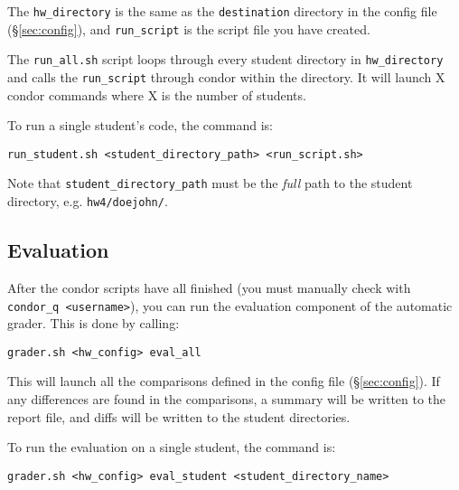 \documentclass[12pt]{article}
\begin{document}
\vspace{5pt}

\noindent The \texttt{hw\_directory}  is the same as the \texttt{destination} directory in the config file (\S\ref{sec:config}), and \texttt{run\_script} is the script file you have created.

The \texttt{run\_all.sh} script loops through every student directory in \texttt{hw\_directory} and calls the \texttt{run\_script} through condor within the directory. It will launch X condor commands where X is the number of students.

To run a single student's code, the command is:

\vspace{5pt}

\noindent \texttt{run\_student.sh <student\_directory\_path> <run\_script.sh>}

\vspace{5pt}

Note that \texttt{student\_directory\_path} must be the \textit{full} path to the student directory, e.g. \texttt{hw4/doejohn/}.

\subsection{Evaluation} \label{sec:secondgrade}

After the condor scripts have all finished (you must manually check with \texttt{condor\_q <username>}), you can run the evaluation component of the automatic grader. This is done by calling:

\vspace{5pt}

\noindent \texttt{grader.sh <hw\_config> eval\_all}

\vspace{5pt}

This will launch all the comparisons defined in the config file (\S\ref{sec:config}). If any differences are found in the comparisons, a summary will be written to the report file, and diffs will be written to the student directories.

To run the evaluation on a single student, the command is:

\vspace{5pt}

\noindent \texttt{grader.sh <hw\_config> eval\_student <student\_directory\_name>}

\vspace{5pt}
\end{document}
